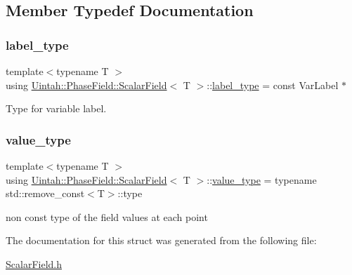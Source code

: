 \subsection{Member Typedef Documentation}
\mbox{\label{structUintah_1_1PhaseField_1_1ScalarField_a7a77875e030da64c47ce9f6c22a06959}} 
\subsubsection{\texorpdfstring{label\+\_\+type}{label\_type}}
{\footnotesize\ttfamily template$<$typename T $>$ \\
using \hyperlink{structUintah_1_1PhaseField_1_1ScalarField}{Uintah\+::\+Phase\+Field\+::\+Scalar\+Field}$<$ T $>$\+::\hyperlink{structUintah_1_1PhaseField_1_1ScalarField_a7a77875e030da64c47ce9f6c22a06959}{label\+\_\+type} =  const Var\+Label $\ast$}



Type for variable label. 

\mbox{\label{structUintah_1_1PhaseField_1_1ScalarField_a76adf747ae93f9113d404af391d1fffd}} 
\subsubsection{\texorpdfstring{value\+\_\+type}{value\_type}}
{\footnotesize\ttfamily template$<$typename T $>$ \\
using \hyperlink{structUintah_1_1PhaseField_1_1ScalarField}{Uintah\+::\+Phase\+Field\+::\+Scalar\+Field}$<$ T $>$\+::\hyperlink{structUintah_1_1PhaseField_1_1ScalarField_a76adf747ae93f9113d404af391d1fffd}{value\+\_\+type} =  typename std\+::remove\+\_\+const$<$T$>$\+::type}



non const type of the field values at each point 



The documentation for this struct was generated from the following file\+:\begin{DoxyCompactItemize}
\item 
\hyperlink{ScalarField_8h}{Scalar\+Field.\+h}\end{DoxyCompactItemize}
